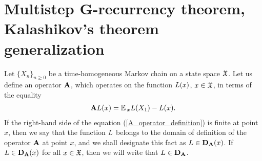 	
	\section{Multistep G-recurrency theorem, Kalashikov's theorem generalization}
	Let $\{X_{n}\}_{n \geq 0}$ be a time-homogeneous Markov chain on a state space $\mathfrak{X}$. Let us define an operator $\mathbf{A}$, which operates on the function $L(x)$, $x \in \mathfrak{X}$, in terms of the equality
	\begin{gather}
	\mathbf{A}L(x) = \operatorname*{\mathbb{E}}{}_{x}L(X_{1}) - L(x).
	\label{A_operator_definition}
	\end{gather}
	If the right-hand side of the equation (\ref{A_operator_definition}) is finite at point $x$, then we say that the function $L$ belongs to the domain of definition of the operator $\mathbf{A}$ at point $x$, and we shall designate this fact as $L \in \mathbf{D}_{\mathbf{A}}(x)$. If $L \in \mathbf{D}_{\mathbf{A}}(x)$ for all $x \in \mathfrak{X}$, then we will write that $L \in \mathbf{D}_{\mathbf{A}}$.
	
